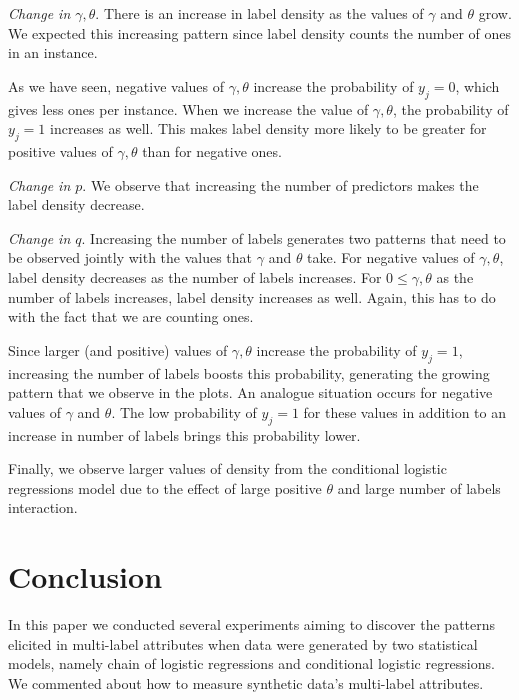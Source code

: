 \documentclass[review]{elsarticle}
\begin{document}
{		\emph{Change in $\gamma,\theta$}. There is an increase in label density as the values of $\gamma$ and $\theta$ grow. We expected this increasing pattern since label density counts the number of ones in an instance. 
		
		As we have seen, negative values of $\gamma, \theta$ increase the probability of $y_{j}=0$, which gives less ones per instance. When we increase the value of $\gamma, \theta$, the probability of $y_{j}=1$ increases as well. This makes label density more likely to be greater for positive values of $\gamma, \theta$ than for negative ones.
		
		\emph{Change in $p$}. We observe that increasing the number of predictors makes the label density decrease.
		
		\emph{Change in $q$}. Increasing the number of labels generates two patterns that need to be observed jointly with the values that $\gamma$ and $\theta$ take. For negative values of $\gamma, \theta$, label density decreases as the number of labels increases. For $0 \leq \gamma, \theta$ as the number of labels increases, label density increases as well. Again, this has to do with the fact that we are counting ones.
		
		Since larger (and positive) values of $\gamma, \theta$ increase the probability of $y_{j}=1$, increasing the number of labels boosts this probability, generating the growing pattern that we observe in the plots. An analogue situation occurs for negative values of $\gamma$ and $\theta$. The low probability of $y_{j}=1$ for these values in addition to an increase in number of labels brings this probability lower.
		
		Finally, we observe larger values of density from the conditional logistic regressions model due to the effect of large positive $\theta$ and large number of labels interaction.
		
		\section{Conclusion}
		\label{CONCL} %
		
		In this paper we conducted several experiments aiming to discover the patterns elicited in multi-label attributes when data were generated by two statistical models, namely chain of logistic regressions and conditional logistic regressions. We commented about how to measure synthetic data's multi-label attributes. 
		
}
\end{document}
